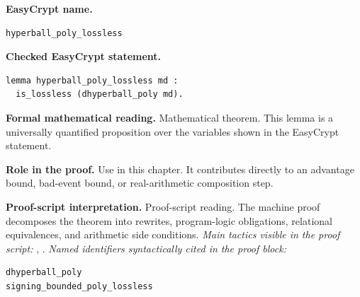 \begin{formaltheorem}
\noindent\textbf{EasyCrypt name.}
\begin{lstlisting}[language=EasyCrypt,basicstyle=\ttfamily\scriptsize]
hyperball_poly_lossless
\end{lstlisting}
\noindent\textbf{Checked EasyCrypt statement.}
\begin{lstlisting}[language=EasyCrypt,basicstyle=\ttfamily\scriptsize]
lemma hyperball_poly_lossless md :
  is_lossless (dhyperball_poly md).
\end{lstlisting}
\noindent\textbf{Formal mathematical reading.}
Mathematical theorem. This lemma is a universally quantified proposition over the variables shown in the EasyCrypt statement.

\noindent\textbf{Role in the proof.}
Use in this chapter. It contributes directly to an advantage bound, bad-event bound, or real-arithmetic composition step.

\noindent\textbf{Proof-script interpretation.}
Proof-script reading. The machine proof decomposes the theorem into rewrites, program-logic obligations, relational equivalences, and arithmetic side conditions.
\emph{Main tactics visible in the proof script:} , .
\emph{Named identifiers syntactically cited in the proof block:}
\begin{lstlisting}[language=EasyCrypt,basicstyle=\ttfamily\scriptsize]
dhyperball_poly
signing_bounded_poly_lossless
\end{lstlisting}

\end{formaltheorem}

